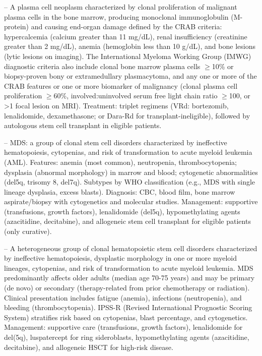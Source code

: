 -- A plasma cell neoplasm characterized by clonal proliferation of malignant plasma cells in the bone marrow, producing monoclonal immunoglobulin (M-protein) and causing end-organ damage defined by the CRAB criteria: hypercalcemia (calcium greater than 11 mg/dL), renal insufficiency (creatinine greater than 2 mg/dL), anemia (hemoglobin less than 10 g/dL), and bone lesions (lytic lesions on imaging). The International Myeloma Working Group (IMWG) diagnostic criteria also include clonal bone marrow plasma cells \(\ge\)10\% or biopsy-proven bony or extramedullary plasmacytoma, and any one or more of the CRAB features or one or more biomarker of malignancy (clonal plasma cell proliferation \(\ge\)60\%, involved:uninvolved serum free light chain ratio \(\ge\)100, or >1 focal lesion on MRI). Treatment: triplet regimens (VRd: bortezomib, lenalidomide, dexamethasone; or Dara-Rd for transplant-ineligible), followed by autologous stem cell transplant in eligible patients.

-- MDS: a group of clonal stem cell disorders characterized by ineffective hematopoiesis, cytopenias, and risk of transformation to acute myeloid leukemia (AML). Features: anemia (most common), neutropenia, thrombocytopenia; dysplasia (abnormal morphology) in marrow and blood; cytogenetic abnormalities (del5q, trisomy 8, del7q). Subtypes by WHO classification (e.g., MDS with single lineage dysplasia, excess blasts). Diagnosis: CBC, blood film, bone marrow aspirate/biopsy with cytogenetics and molecular studies. Management: supportive (transfusions, growth factors), lenalidomide (del5q), hypomethylating agents (azacitidine, decitabine), and allogeneic stem cell transplant for eligible patients (only curative).

-- A heterogeneous group of clonal hematopoietic stem cell disorders characterized by ineffective hematopoiesis, dysplastic morphology in one or more myeloid lineages, cytopenias, and risk of transformation to acute myeloid leukemia. MDS predominantly affects older adults (median age 70-75 years) and may be primary (de novo) or secondary (therapy-related from prior chemotherapy or radiation). Clinical presentation includes fatigue (anemia), infections (neutropenia), and bleeding (thrombocytopenia). IPSS-R (Revised International Prognostic Scoring System) stratifies risk based on cytopenias, blast percentage, and cytogenetics. Management: supportive care (transfusions, growth factors), lenalidomide for del(5q), luspatercept for ring sideroblasts, hypomethylating agents (azacitidine, decitabine), and allogeneic HSCT for high-risk disease.


